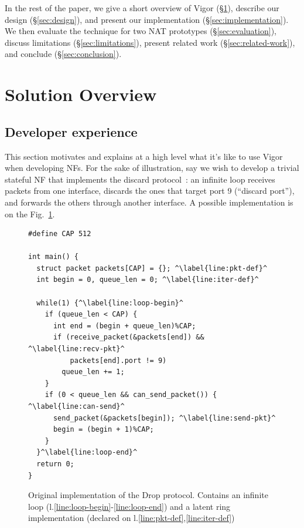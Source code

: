 \documentclass[letterpaper,twocolumn,10pt]{article}
\begin{document}
In the rest of the paper, we give a short overview of Vigor
(\S\ref{sec:solution-overview}), describe our design (\S\ref{sec:design}), and
present our implementation (\S\ref{sec:implementation}). We then evaluate the
technique for two NAT prototypes (\S\ref{sec:evaluation}), discuss limitations
(\S\ref{sec:limitations}), present related work (\S\ref{sec:related-work}), and
conclude (\S\ref{sec:conclusion}).


\section{Solution Overview}
\label{sec:solution-overview}

\subsection{Developer experience}

This section motivates and explains at a high level what it's like to use Vigor
when developing NFs. For the sake of illustration, say we wish to develop a
trivial stateful NF that implements the discard protocol~\cite{rfc863}: an
infinite loop receives packets from one interface, discards the ones that target
port 9 (``discard port''), and forwards the others through another interface.
A possible implementation is on the Fig.~\ref{lst:orig}.

\begin{figure}[h!]
\begin{lstlisting}
#define CAP 512

int main() {
  struct packet packets[CAP] = {}; ^\label{line:pkt-def}^
  int begin = 0, queue_len = 0; ^\label{line:iter-def}^

  while(1) {^\label{line:loop-begin}^
    if (queue_len < CAP) {
      int end = (begin + queue_len)%CAP;
      if (receive_packet(&packets[end]) && ^\label{line:recv-pkt}^
          packets[end].port != 9)
        queue_len += 1;
    }
    if (0 < queue_len && can_send_packet()) { ^\label{line:can-send}^
      send_packet(&packets[begin]); ^\label{line:send-pkt}^
      begin = (begin + 1)%CAP;
    }
  }^\label{line:loop-end}^
  return 0;
}
\end{lstlisting}
  \caption{Original implementation of the Drop protocol. Contains an infinite
    loop (l.\ref{line:loop-begin}-\ref{line:loop-end}) and a latent ring
    implementation (declared on l.\ref{line:pkt-def},\ref{line:iter-def})}
  \label{lst:orig}
\end{figure}
\end{document}
